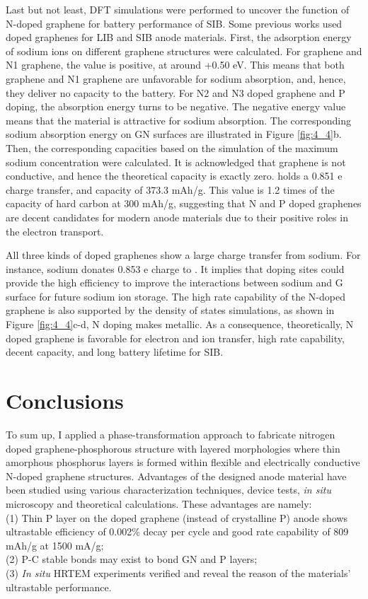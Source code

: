 Last but not least, DFT simulations were performed to uncover the function of N-doped graphene for battery performance of SIB. 
Some previous works used doped graphenes for LIB and SIB anode materials.\cite{Yang2011c,Wen2014b,Wang2013h,Wang2012e,Wang2014f} 
First, the adsorption energy of sodium ions on different graphene structures were calculated. 
For graphene and N1 graphene, the value is positive, at around +0.50 eV. 
This means that both graphene and N1 graphene are unfavorable for sodium absorption, and, hence, they deliver no capacity to the battery. 
For N2 and N3 doped graphene and P doping, the absorption energy turns to be negative. 
The negative energy value means that the material is attractive for sodium absorption. 
The corresponding sodium absorption energy on GN surfaces are illustrated in Figure \ref{fig:4_4}b. 
Then, the corresponding capacities based on the simulation of the maximum sodium concentration were calculated. 
It is acknowledged that graphene is not conductive, and hence the theoretical capacity is exactly zero.
 holds a 0.851 e charge transfer, and capacity of 373.3 mAh/g. This value is 1.2 times of the capacity of hard carbon at 300 mAh/g, suggesting that N and P doped graphenes are decent candidates for modern anode materials due to their positive roles in the electron transport. 

All three kinds of doped graphenes show a large charge transfer from sodium.
For instance, sodium donates 0.853 e charge to . 
It implies that doping sites could provide the high efficiency to improve the interactions between sodium and G surface for future sodium ion storage. 
The high rate capability of the N-doped graphene is also supported by the density of states simulations, as shown in Figure \ref{fig:4_4}c-d, N doping makes  metallic. 
As a consequence, theoretically, N doped graphene is favorable for electron and ion transfer, high rate capability, decent capacity, and long battery lifetime for SIB.
\vfill %

\section{Conclusions}
To sum up, I applied a phase-transformation approach to fabricate nitrogen doped graphene-phosphorous structure with layered morphologies where thin amorphous phosphorus layers is formed within flexible and electrically conductive N-doped graphene structures. 
Advantages of the designed anode material have been studied using various characterization techniques, device tests, {\em in situ} microscopy and theoretical calculations. 
These advantages are namely: \\
(1) Thin P layer on the doped graphene (instead of crystalline P) anode shows ultrastable efficiency of 0.002\% decay per cycle and good rate capability of 809 mAh/g at 1500 mA/g; \\
(2) P-C stable bonds may exist to bond GN and P layers; \\
(3) {\em In situ} HRTEM experiments verified and reveal the reason of the materials' ultrastable performance.\\

